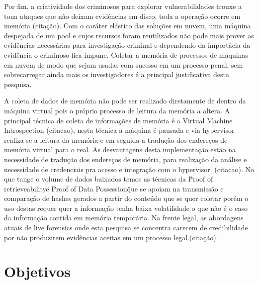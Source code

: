 \documentclass[
	12pt,				%
	openright,			%
	oneside,			%
	a4paper,			%
	english,			%
	french,				%
	spanish,			%
	brazil,				%
	]{abntex2}
\begin{document}
\par

Por fim, a criatividade dos criminosos para explorar vulnerabilidades trouxe a tona ataques que não deixam evidências em disco, toda a operação ocorre em memória (citação). Com o 
caráter elástico das soluções em nuvem, uma máquina despejada de um pool e cujos recursos foram reutilizados não pode mais prover as evidências necessárias para investigação criminal e 
dependendo da importâcia da evidência o criminoso fica impune. Coletar a memória de processos de máquinas em nuvem de modo que sejam usadas com sucesso em um processo penal, sem 
sobrecarregar ainda mais os investigadores é a principal justificativa desta pesquisa.

\par

A coleta de dados de memória não pode ser realizado diretamente de dentro da máquina virtual pois o próprio processo de leitura da memória a altera. A principal técnica de coleta
de informações de memória é a Virtual Machine Introspection (citacao), nesta técnica a máquina é pausada e via hypervisor realiza-se a leitura da memória e em seguida a tradução dos 
endereços de memória virtual para o real. As desvantagens desta implementação estão na necessidade de tradução dos endereços de memória, para realização da análise e necessidade de 
credenciais pra acesso e integração com o hypervisor. (citacao). No que tange o volume de dados baixados temos as técnicas da \"Proof of retrieveability\" e \"Proof of Data Possession\" 
que se apoiam na transmissão e comparação de hashes gerados a partir do conteúdo que se quer coletar porém o uso destas requer quer a informação tenha baixa volatilidade o que não 
é o caso da informação contida em memória temporária. Na frente legal, as abordagens atuais de live forensics onde esta pesquisa se concentra carecem de credibilidade por não produzirem evidências aceitas em um processo legal.(citação).

\chapter{Objetivos}
\end{document}
